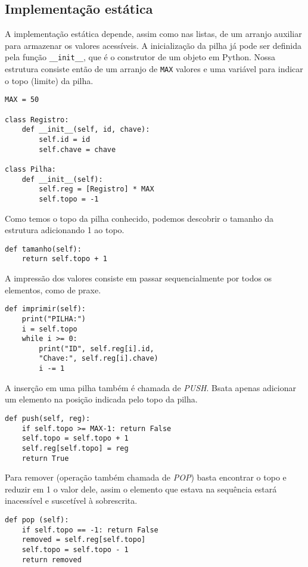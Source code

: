 \documentclass[a4paper, twocolumn]{article}
\theoremstyle{definition}
\begin{document}
\subsection{Implementação estática}

A implementação estática depende, assim como nas listas, de um arranjo auxiliar para armazenar os valores acessíveis. A inicialização da pilha já pode ser definida pela função \texttt{\_\_init\_\_}, que é o construtor de um objeto em Python. Nossa estrutura consiste então de um arranjo de \texttt{MAX} valores e uma variável para indicar o topo (limite) da pilha.

\begin{lstlisting}[label=pilha_estrutura, caption= Pilha estática (estrutura)]
MAX = 50

class Registro:
    def __init__(self, id, chave):
        self.id = id
        self.chave = chave

class Pilha:
    def __init__(self):
        self.reg = [Registro] * MAX
        self.topo = -1
\end{lstlisting}

Como temos o topo da pilha conhecido, podemos descobrir o tamanho da estrutura adicionando 1 ao topo.
\begin{lstlisting}[label=pilha_tamanho, caption= Pilha estática (tamanho)]
def tamanho(self):
    return self.topo + 1
\end{lstlisting}


A impressão dos valores consiste em passar sequencialmente por todos os elementos, como de praxe.
\begin{lstlisting}[label=pilha_imprimir, caption= Pilha estática (exibição)]
def imprimir(self):
    print("PILHA:")
    i = self.topo
    while i >= 0:
        print("ID", self.reg[i].id,
        "Chave:", self.reg[i].chave)
        i -= 1
\end{lstlisting}

A inserção em uma pilha também é chamada de \textit{PUSH}. Bsata apenas adicionar um elemento na posição indicada pelo topo da pilha.
\begin{lstlisting}[label=pilha_inserir, caption= Pilha estática (inserção)]
def push(self, reg):
    if self.topo >= MAX-1: return False
    self.topo = self.topo + 1
    self.reg[self.topo] = reg
    return True
\end{lstlisting}

Para remover (operação também chamada de \textit{POP}) basta encontrar o topo e reduzir em 1 o valor dele, assim o elemento que estava na sequência estará inacessível e suscetível à sobrescrita.
\begin{lstlisting}[label=pilha_remover, caption= Pilha estática (remoção)]
def pop (self):
    if self.topo == -1: return False
    removed = self.reg[self.topo]
    self.topo = self.topo - 1
    return removed
\end{lstlisting}
\end{document}
